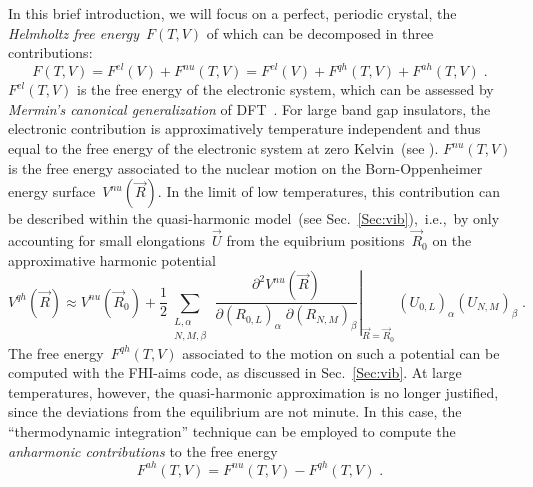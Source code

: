 In this brief introduction, we will focus on a perfect, periodic crystal, the 
{\it Helmholtz free energy}~$F(T,V)$ of which can be decomposed in 
three contributions:
\begin{equation}
F(T,V) = F^{el}(V) + F^{nu}(T,V) = F^{el}(V) + F^{qh}(T,V) + F^{ah}(T,V)\;. 
\end{equation}
$F^{el}(T,V)$ is the free energy of the electronic system, which can be
assessed by {\it Mermin's canonical generalization} of DFT~\cite{Mermin65}. 
For large band gap insulators, the electronic contribution is approximatively 
temperature independent and thus equal to the free energy of the electronic 
system at zero Kelvin~(see 
). $F^{nu}(T,V)$ is the free energy associated to 
the nuclear motion on the Born-Oppenheimer energy surface~$V^{nu}(\vec{R})$. 
In the limit of low temperatures, this contribution can be described within the 
quasi-harmonic model~(see Sec.~\ref{Sec:vib}),~i.e.,~by only accounting for 
small elongations~$\vec{U}$ from the equibrium positions~$\vec{R}_0$ on the 
approximative harmonic potential
\begin{equation}
V^{qh}(\vec{R}) \approx  V^{nu}(\vec{R}_0) + 
\frac{1}{2}
\sum\limits_{\substack{
L,\alpha\\
N,M,\beta
}}\,
\left. \frac{\partial^2 V^{nu}(\vec{R})}{\partial \left(R_{0,L}\right)_\alpha\;\partial \left(R_{N,M}\right)_\beta} \right\vert_{\vec{R}=\vec{R}_0}
\, (U_{0,L})_\alpha (U_{N,M})_\beta \; .
\label{HarmPot}
\end{equation}
The free energy~$F^{qh}(T,V)$ associated to the motion on such a 
potential can be computed with the FHI-aims code, as discussed in 
Sec.~\ref{Sec:vib}. At large temperatures, however, the quasi-harmonic 
approximation is no longer justified, since the deviations from the equilibrium 
are not minute. In this case, the ``thermodynamic integration'' technique can
be employed to compute the {\it anharmonic contributions} to the free energy
\begin{equation}
F^{ah}(T,V) = F^{nu}(T,V) - F^{qh}(T,V)\;.
\end{equation}


